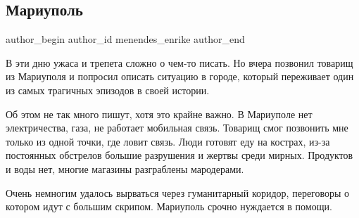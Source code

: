  
 
 
 
 
 
\subsection{Мариуполь}
\label{sec:09_03_2022.fb.menendes_enrike.1.mariupol}
 
\ifcmt
 author_begin
   author_id menendes_enrike
 author_end
\fi

В эти дню ужаса и трепета сложно о чем-то писать. Но вчера позвонил товарищ из
Мариуполя и попросил описать ситуацию в городе, который переживает один из
самых трагичных эпизодов в своей истории.

Об этом не так много пишут, хотя это крайне важно. В Мариуполе нет
электричества, газа, не работает мобильная связь. Товарищ смог позвонить мне
только из одной точки, где ловит связь. Люди готовят еду на кострах, из-за
постоянных обстрелов большие разрушения и жертвы среди мирных. Продуктов и воды
нет, многие магазины разграблены мародерами. 

Очень немногим удалось вырваться через гуманитарный коридор, переговоры о
котором идут с большим скрипом. Мариуполь срочно нуждается в помощи.

